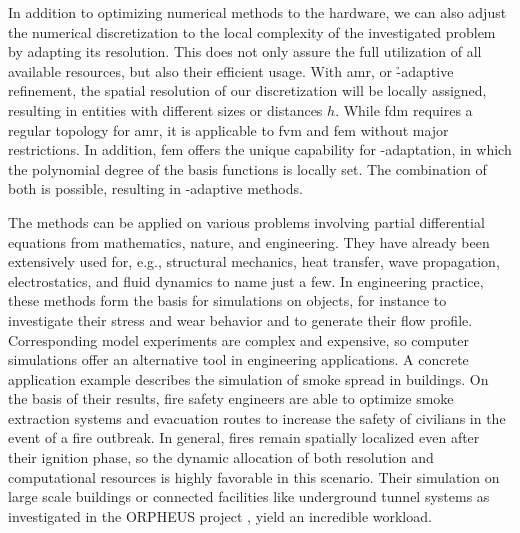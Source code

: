 In addition to optimizing numerical methods to the hardware, we can also adjust the numerical discretization to the local complexity of the investigated problem by adapting its resolution.
This does not only assure the full utilization of all available resources, but also their efficient usage.
With \gls{amr}, or \h-adaptive refinement, the spatial resolution of our discretization will be locally assigned, resulting in entities with different sizes or distances $h$. While \gls{fdm} requires a regular topology for \gls{amr}, it is applicable to \gls{fvm} and \gls{fem} without major restrictions. In addition, \gls{fem} offers the unique capability for \p-adaptation, in which the polynomial degree of the basis functions is locally set. The combination of both is possible, resulting in \hp-adaptive methods.


The methods can be applied on various problems involving partial differential equations from mathematics, nature, and engineering. They have already been extensively used for, e.g., structural mechanics, heat transfer, wave propagation, electrostatics, and fluid dynamics to name just a few.
In engineering practice, these methods form the basis for simulations on objects, for instance to investigate their stress and wear behavior and to generate their flow profile. Corresponding model experiments are complex and expensive, so computer simulations offer an alternative tool in engineering applications.
A concrete application example describes the simulation of smoke spread in buildings.
On the basis of their results, fire safety engineers are able to optimize smoke extraction systems and evacuation routes to increase the safety of civilians in the event of a fire outbreak.
In general, fires remain spatially localized even after their ignition phase, so the dynamic allocation of both resolution and computational resources is highly favorable in this scenario.
Their simulation on large scale buildings or connected facilities like underground tunnel systems as investigated in the ORPHEUS project \parencite{arnold2017}, yield an incredible workload.

